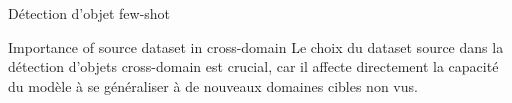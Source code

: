 \begin{subsectionframemod}{Détection d'objet few-shot}

    \begin{alertblock}{Importance of source dataset in cross-domain}
        Le choix du dataset source dans la détection d'objets cross-domain est crucial,
        car il affecte directement la capacité du modèle à se généraliser à de nouveaux domaines cibles non vus.
    \end{alertblock}

    
\end{subsectionframemod}
